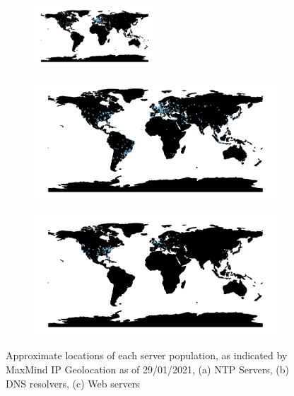 \documentclass{l4proj}
\begin{document}
\begin{figure}[H]
    \centering
    
    \begin{subfigure}[b]{\textwidth}
         \centering
         \includegraphics[width=0.5\textwidth]{dissertation/images/ntp.locs.map.pdf}
         \caption{}
     \end{subfigure}
     
     \centering
\begin{subfigure}{.5\textwidth}
  \centering
  \includegraphics[width=\linewidth]{dissertation/images/dns.locs.map.pdf}
  \caption{}
  \label{fig:sub1}
\end{subfigure}%
\begin{subfigure}{.5\textwidth}
  \centering
  \includegraphics[width=\linewidth]{dissertation/images/web.locs.map.pdf}
  \caption{}
  \label{fig:sub2}
\end{subfigure}
\caption{Approximate locations of each server population, as indicated by MaxMind IP Geolocation as of 29/01/2021, (a) NTP Servers, (b) DNS resolvers, (c) Web servers}
\label{fig:locs}
  
\end{figure}
\end{document}
